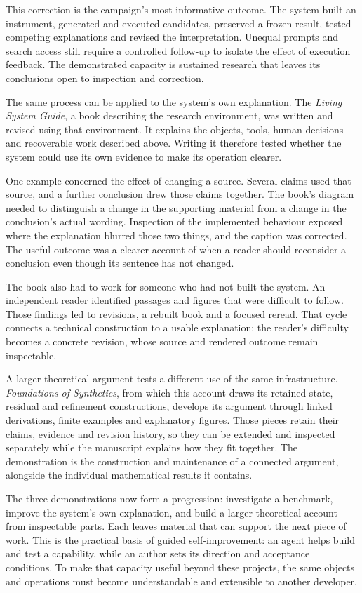 This correction is the campaign's most informative outcome. The system built an instrument, generated and executed candidates, preserved a frozen result, tested competing explanations and revised the interpretation. Unequal prompts and search access still require a controlled follow-up to isolate the effect of execution feedback. The demonstrated capacity is sustained research that leaves its conclusions open to inspection and correction.

The same process can be applied to the system's own explanation. The \emph{Living System Guide}, a book describing the research environment, was written and revised using that environment. It explains the objects, tools, human decisions and recoverable work described above. Writing it therefore tested whether the system could use its own evidence to make its operation clearer.

One example concerned the effect of changing a source. Several claims used that source, and a further conclusion drew those claims together. The book's diagram needed to distinguish a change in the supporting material from a change in the conclusion's actual wording. Inspection of the implemented behaviour exposed where the explanation blurred those two things, and the caption was corrected. The useful outcome was a clearer account of when a reader should reconsider a conclusion even though its sentence has not changed.

The book also had to work for someone who had not built the system. An independent reader identified passages and figures that were difficult to follow. Those findings led to revisions, a rebuilt book and a focused reread. That cycle connects a technical construction to a usable explanation: the reader's difficulty becomes a concrete revision, whose source and rendered outcome remain inspectable.

A larger theoretical argument tests a different use of the same infrastructure. \emph{Foundations of Synthetics}, from which this account draws its retained-state, residual and refinement constructions, develops its argument through linked derivations, finite examples and explanatory figures. Those pieces retain their claims, evidence and revision history, so they can be extended and inspected separately while the manuscript explains how they fit together. The demonstration is the construction and maintenance of a connected argument, alongside the individual mathematical results it contains.

The three demonstrations now form a progression: investigate a benchmark, improve the system's own explanation, and build a larger theoretical account from inspectable parts. Each leaves material that can support the next piece of work. This is the practical basis of guided self-improvement: an agent helps build and test a capability, while an author sets its direction and acceptance conditions. To make that capacity useful beyond these projects, the same objects and operations must become understandable and extensible to another developer.

